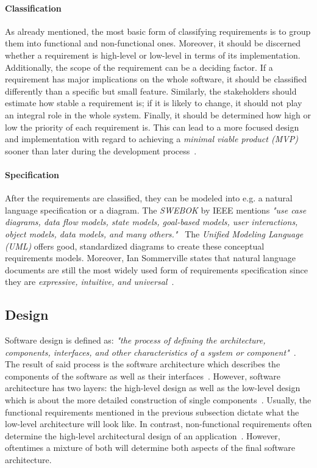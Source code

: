 \documentclass[12pt,a4paper]{report}
\begin{document}
\paragraph{Classification}
As already mentioned, the most basic form of classifying requirements is to group
them into functional and non-functional ones. Moreover, it should be discerned
whether a requirement is high-level or low-level in terms of its implementation.
Additionally, the scope of the requirement can be a deciding factor.
If a requirement has major implications on the whole software, it should be classified
differently than a specific but small feature. Similarly, the stakeholders should
estimate how stable a requirement is; if it is likely to change, it should not
play an integral role in the whole system.
Finally, it should be determined how high or low the priority of each requirement is.
This can lead to a more focused design and implementation with regard to achieving
a \textit{minimal viable product (MVP)} sooner than later during
the development process~\cite{swebok, sommerville-se}.

\paragraph{Specification}
After the requirements are classified, they can be modeled into e.g.
a natural language specification or a diagram.
The \textit{SWEBOK} by IEEE mentions \textit{"use case diagrams, data flow models,
state models, goal-based models, user interactions,
object models, data models, and many others."}~\cite{swebok}
The \textit{Unified Modeling Language (UML)} offers good, standardized diagrams
to create these conceptual requirements models.
Moreover, Ian Sommerville states that natural language documents
are still the most widely used form of requirements specification since they are
\textit{expressive, intuitive, and universal}~\cite{sommerville-se}.


\subsection{Design} \label{subsect:design}

Software design is defined as: \textit{"the process of defining
the architecture, components, interfaces, and other characteristics
of a system or component"}~\cite{iso-se}.
The result of said process is the software architecture which describes the
components of the software as well as their interfaces~\cite{swebok}.
However, software architecture has two layers: the high-level design as well as
the low-level design which is about the more detailed
construction of single components~\cite{iso-sdlc}.
Usually, the functional requirements mentioned in the previous subsection dictate
what the low-level architecture will look like. In contrast, non-functional
requirements often determine the high-level architectural design of an application~\cite{bosch-sa}.
However, oftentimes a mixture of both will determine both aspects of the final software architecture.
\end{document}
